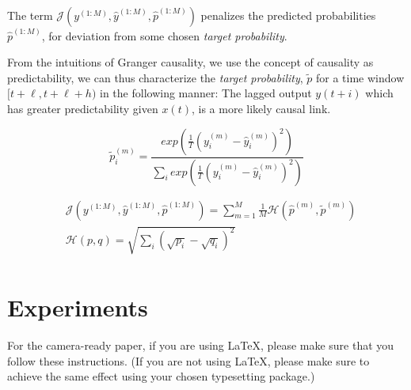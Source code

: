 \documentclass[twoside]{article}
\begin{document}
The term $\mathcal{J}(y^{(1:M)}, \hat{y}^{(1:M)}, \hat{p}^{(1:M)})$ penalizes the predicted probabilities $\hat{p}^{(1:M)}$, for deviation from some chosen \textit{target probability}.

From the intuitions of Granger causality, we use the concept of causality as predictability, we can thus characterize the \emph{target probability}, $\widetilde{p}$ for a time window $[t+\ell, t+\ell+h)$ in the following manner: 
The lagged output $y(t+i)$ which has greater predictability given $x(t)$, is a more likely causal link. 

\begin{equation}
\widetilde{p}_{i}^{(m)} = \frac{exp \left( \frac{1}{T} (y_{i}^{(m)} - \hat{y}_{i}^{(m)})^{2} \right)}{\sum_{i}{exp \left( \frac{1}{T} (y_{i}^{(m)} - \hat{y}_{i}^{(m)})^{2} \right)}} 
\end{equation}

\begin{align}
& \mathcal{J}(y^{(1:M)}, \hat{y}^{(1:M)}, \hat{p}^{(1:M)}) = \sum_{m = 1}^{M}{\frac{1}{M} \mathcal{H}(\hat{p}^{(m)}, \widetilde{p}^{(m)})} \\
& \mathcal{H}(p, q) = \sqrt{\sum_{i}{(\sqrt{p_i} -  \sqrt{q_i})^2}}\\
\end{align}



\section{Experiments}

For the camera-ready paper, if you are using \LaTeX, please make sure
that you follow these instructions.  (If you are not using \LaTeX,
please make sure to achieve the same effect using your chosen
typesetting package.)
\end{document}
